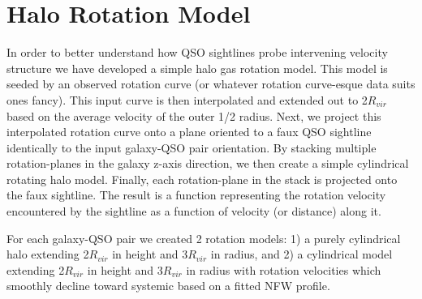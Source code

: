 \documentclass[iop]{emulateapj-rtx4}
\begin{document}
\section{Halo Rotation Model}
In order to better understand how QSO sightlines probe intervening velocity structure we have developed a simple halo gas rotation model. This model is seeded by an observed rotation curve (or whatever rotation curve-esque data suits ones fancy). This input curve is then interpolated and extended out to 2$R_{vir}$ based on the average velocity of the outer 1/2 radius. Next, we project this interpolated rotation curve onto a plane oriented to a faux QSO sightline identically to the input galaxy-QSO pair orientation. By stacking multiple rotation-planes in the galaxy z-axis direction, we then create a simple cylindrical rotating halo model. Finally, each rotation-plane in the stack is projected onto the faux sightline. The result is a function representing the rotation velocity encountered by the sightline as a function of velocity (or distance) along it.

For each galaxy-QSO pair we created 2 rotation models: 1) a purely cylindrical halo extending 2$R_{vir}$ in height and 3$R_{vir}$ in radius, and 2) a cylindrical model extending 2$R_{vir}$ in height and 3$R_{vir}$ in radius with rotation velocities which smoothly decline toward systemic based on a fitted NFW profile.






\end{document}
